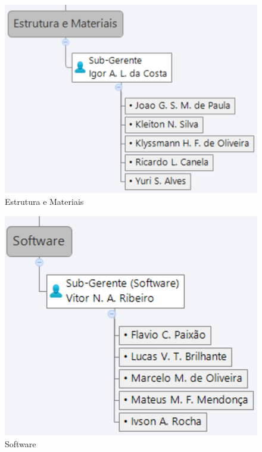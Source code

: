 \begin{figure}[H]
  \begin{center}
	\includegraphics[keepaspectratio,scale=0.6]{figuras/estrutura_materiais.eps}
	\caption{Estrutura e Materiais}
  \end{center}
\end{figure}

\begin{figure}[H]
  \begin{center}
	\includegraphics[keepaspectratio,scale=0.6]{figuras/software.eps}
	\caption{Software}
  \end{center}
\end{figure}
